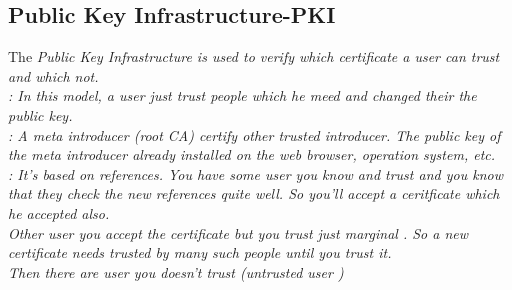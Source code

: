 \subsection{Public Key Infrastructure-PKI}
The \em Public Key Infrastructure \em is used to verify which certificate a user can trust and which not.\\
: 
In this model, a user just trust people which he meed and changed their the public key. \\
: A \em meta introducer \em (root CA) certify other trusted introducer. The public key of the meta introducer 
already installed on the web browser, operation system, etc. \\
: It's based on references. You have some user you know and \em trust \em and you know that 
they check the new references quite well. So you'll accept a ceritficate which he accepted also.\\
Other user you accept the certificate but you trust just \em marginal \em. So a new certificate needs trusted by many such people until you trust it.\\
Then there are user you doesn't trust (\em untrusted user \em)

